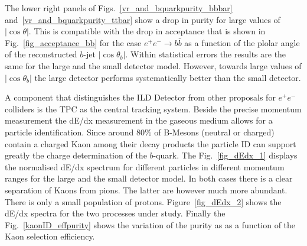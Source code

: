 \documentclass[preprint]{elsarticle}
\begin{document}
The lower right panels of Figs.~\ref{vr_and_bquarkpurity_bbbar} and~\ref{vr_and_bquarkpurity_ttbar} show a drop in purity for large values of $|\cos \theta|$. This is compatible with the drop in acceptance that is shown in Fig.~\ref{fig_acceptance_bb} for the case $e^+e^-\rightarrow b\bar{b}$ as a function of the plolar angle of the reconstructed $b$-jet $|\cos \theta_b|$. Within statistical errors the results are the same for the large and the small detector model. However, towards large values of   
$|\cos \theta_b|$ the large detector performs systematically better than the small detector.

A component that distinguishes the ILD Detector from other proposals for $e^+e^-$ colliders is the TPC as the central tracking system. Beside the precise momentum measurement the dE/dx measurement in the gaseous medium allows for a particle identification. Since around 80\% of B-Mesons (neutral or charged) contain a charged Kaon among their decay products the particle ID can support greatly the charge determination of the $b$-quark. The Fig.~\ref{fig_dEdx_1} displays the normalised dE/dx spectrum for different particles in different momentum ranges for the large and the small detector model. In both cases there is a clear separation of Kaons from pions. The latter are however much more abundant. There is only a small population of protons. Figure~\ref{fig_dEdx_2} shows the dE/dx spectra for the two processes under study. Finally the Fig.~\ref{kaonID_effpurity} shows the variation of the purity as as a function of the Kaon selection efficiency.




\end{document}
